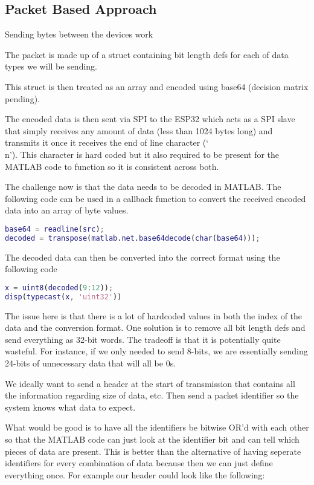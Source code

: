 \subsection{Packet Based Approach}
Sending bytes between the devices work

The packet is made up of a struct containing bit length defs
for each of data types we will be sending.

This struct is then treated as an array and encoded using base64
(decision matrix pending).

The encoded data is then sent via SPI to the ESP32 which acts
as a SPI slave that simply receives any amount of data
(less than 1024 bytes long) and transmits it once it receives
the end of line character (`\\n').
This character is hard coded but it also required to be present
for the MATLAB code to function so it is consistent across both.

The challenge now is that the data needs to be decoded in MATLAB.
The following code can be used in a callback function to convert
the received encoded data into an array of byte values.

\begin{lstlisting}[language=MATLAB]
base64 = readline(src);
decoded = transpose(matlab.net.base64decode(char(base64)));
\end{lstlisting}

The decoded data can then be converted into the correct format
using the following code

\begin{lstlisting}[language=MATLAB]
x = uint8(decoded(9:12));
disp(typecast(x, 'uint32'))
\end{lstlisting}

The issue here is that there is a lot of hardcoded values
in both the index of the data and the conversion format.
One solution is to remove all bit length defs and send everything
as 32-bit words. The tradeoff is that it is potentially quite wasteful.
For instance, if we only needed to send 8-bits, we are essentially
sending 24-bits of unnecessary data that will all be 0s.

We ideally want to send a header at the start of transmission that
contains all the information regarding size of data, etc.
Then send a packet identifier so the system knows what data to expect.

What would be good is to have all the identifiers be bitwise OR'd
with each other so that the MATLAB code can just look at the identifier
bit and can tell which pieces of data are present.
This is better than the alternative of having seperate identifiers for
every combination of data because then we can just define everything once.
For example our header could look like the following:

